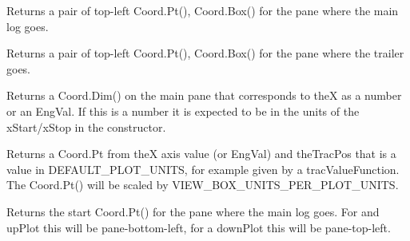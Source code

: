 \documentclass[letterpaper,10pt,english]{sphinxmanual}
\begin{document}
\begin{fulllineitems}

\begin{fulllineitems}
\label{\detokenize{ref/util/plot/Plot:TotalDepth.util.plot.Plot.PlotRoll.retMainPane}}
Returns a pair of top-left Coord.Pt(), Coord.Box() for the pane
where the main log goes.

\end{fulllineitems}


\begin{fulllineitems}
\label{\detokenize{ref/util/plot/Plot:TotalDepth.util.plot.Plot.PlotRoll.retTailPane}}
Returns a pair of top-left Coord.Pt(), Coord.Box() for the pane
where the trailer goes.

\end{fulllineitems}


\begin{fulllineitems}
\label{\detokenize{ref/util/plot/Plot:TotalDepth.util.plot.Plot.PlotRoll.xDepth}}
Returns a Coord.Dim() on the main pane that corresponds to theX as
a number or an EngVal. If this is a number it is expected to be in the
units of the xStart/xStop in the constructor.

\end{fulllineitems}


\begin{fulllineitems}
\label{\detokenize{ref/util/plot/Plot:TotalDepth.util.plot.Plot.PlotRoll.polyLinePt}}
Returns a Coord.Pt from theX axis value (or EngVal) and theTracPos
that is a value in DEFAULT\_PLOT\_UNITS, for example given by a
tracValueFunction.
The Coord.Pt() will be scaled by VIEW\_BOX\_UNITS\_PER\_PLOT\_UNITS.

\end{fulllineitems}


\begin{fulllineitems}
\label{\detokenize{ref/util/plot/Plot:TotalDepth.util.plot.Plot.PlotRoll.retMainPaneStart}}
Returns the start Coord.Pt() for the pane where the main log goes.
For and upPlot this will be pane-bottom-left, for a downPlot this will
be pane-top-left.


\end{fulllineitems}
\end{fulllineitems}
\end{document}
